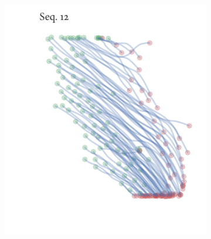\begin{figure}[h]
\begin{subfigure}[t]{0.5\textwidth}
	\end{subfigure}%
	\begin{subfigure}[t]{0.5\textwidth}
		\centering
		\includegraphics{streamline_sequence12.pdf}
	\end{subfigure}
\end{figure}

